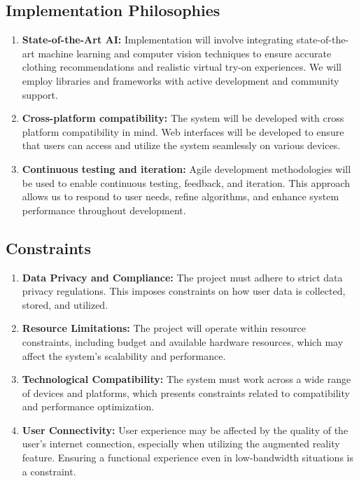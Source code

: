 	\subsection{Implementation Philosophies}
		\begin{enumerate}
			\item \textbf{State-of-the-Art AI:} Implementation will involve integrating state-of-the-art machine learning and computer vision techniques to ensure accurate clothing recommendations and realistic virtual try-on experiences. We will employ libraries and frameworks with active development and community support.
			\item \textbf{Cross-platform compatibility:} The system will be developed with cross platform compatibility in mind. Web interfaces will be developed to ensure that users can access and utilize the system seamlessly on various devices.
			\item \textbf{Continuous testing and iteration:} Agile development methodologies will be used to enable continuous testing, feedback, and iteration. This approach allows us to respond to user needs, refine algorithms, and enhance system performance throughout development.
		\end{enumerate}

	\subsection{Constraints}
		\begin{enumerate}
			\item \textbf{Data Privacy and Compliance:} The project must adhere to strict data privacy regulations. This imposes constraints on how user data is collected, stored, and utilized.
			\item \textbf{Resource Limitations:} The project will operate within resource constraints, including budget and available hardware resources, which may affect the system's scalability and performance.
			\item \textbf{Technological Compatibility:} The system must work across a wide range of devices and platforms, which presents constraints related to compatibility and performance optimization.
			\item \textbf{User Connectivity:} User experience may be affected by the quality of the user's internet connection, especially when utilizing the augmented reality feature. Ensuring a functional experience even in low-bandwidth situations is a constraint.
		\end{enumerate}

